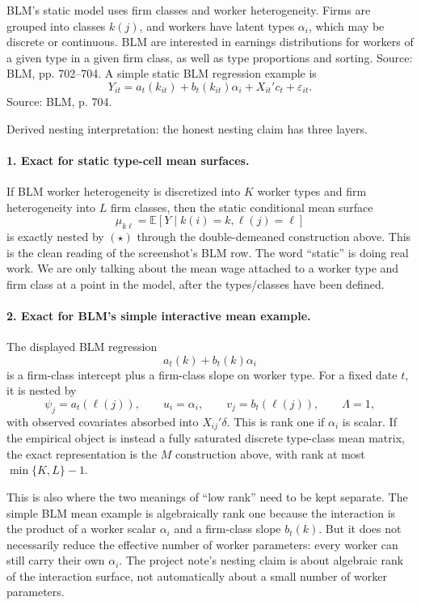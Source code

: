 ﻿\documentclass[11pt]{article}
\newcommand{\E}{\mathbb{E}}
\newcommand{\1}{\mathbf{1}}
\begin{document}
BLM's static model uses firm classes and worker heterogeneity. Firms are grouped
into classes $k(j)$, and workers have latent types $\alpha_i$, which may be
discrete or continuous. BLM are interested in earnings distributions for workers
of a given type in a given firm class, as well as type proportions and sorting.
Source: BLM, pp. 702--704. A simple static BLM regression example is
\[
Y_{it}=a_t(k_{it})+b_t(k_{it})\alpha_i+X_{it}'c_t+\varepsilon_{it}.
\]
Source: BLM, p. 704.

Derived nesting interpretation: the honest nesting claim has three layers.

\paragraph{1. Exact for static type-cell mean surfaces.}
If BLM worker heterogeneity is discretized into $K$ worker types and firm
heterogeneity into $L$ firm classes, then the static conditional mean surface
\[
\mu_{k\ell}
=
\E[Y\mid k(i)=k,\ell(j)=\ell]
\]
is exactly nested by $(\star)$ through the double-demeaned construction above.
This is the clean reading of the screenshot's BLM row.
The word ``static'' is doing real work. We are only talking about the mean wage
attached to a worker type and firm class at a point in the model, after the
types/classes have been defined.

\paragraph{2. Exact for BLM's simple interactive mean example.}
The displayed BLM regression
\[
a_t(k)+b_t(k)\alpha_i
\]
is a firm-class intercept plus a firm-class slope on worker type. For a fixed
date $t$, it is nested by
\[
\psi_j=a_t(\ell(j)),
\qquad
u_i=\alpha_i,
\qquad
v_j=b_t(\ell(j)),
\qquad
\Lambda=1,
\]
with observed covariates absorbed into $X_{ij}'\delta$. This is rank one if
$\alpha_i$ is scalar. If the empirical object is instead a fully saturated
discrete type-class mean matrix, the exact representation is the $M$ construction
above, with rank at most $\min\{K,L\}-1$.

This is also where the two meanings of ``low rank'' need to be kept separate.
The simple BLM mean example is algebraically rank one because the interaction is
the product of a worker scalar $\alpha_i$ and a firm-class slope $b_t(k)$. But it
does not necessarily reduce the effective number of worker parameters: every
worker can still carry their own $\alpha_i$. The project note's nesting claim is
about algebraic rank of the interaction surface, not automatically about a small
number of worker parameters.
\end{document}
